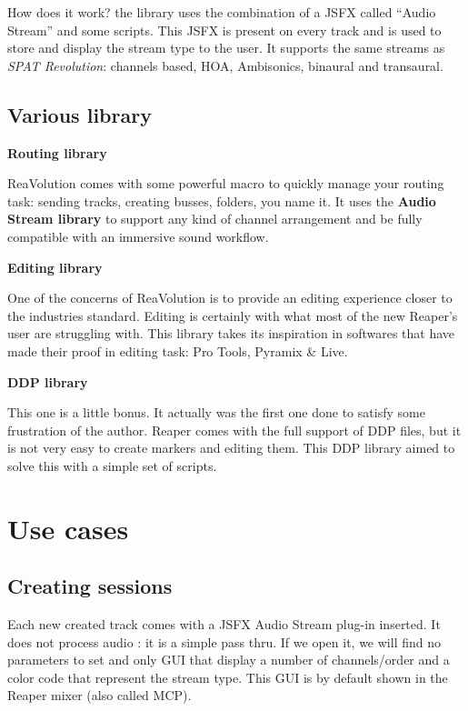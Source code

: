 \documentclass[
  letterpaper,
  DIV=11,
  numbers=noendperiod]{scrreport}
\begin{document}
How does it work? the library uses the combination of a JSFX called
``Audio Stream'' and some scripts. This JSFX is present on every track
and is used to store and display the stream type to the user. It
supports the same streams as \emph{SPAT Revolution}: channels based,
HOA, Ambisonics, binaural and transaural.

\hypertarget{various-library}{%
\subsection{Various library}\label{various-library}}

\textbf{Routing library}

ReaVolution comes with some powerful macro to quickly manage your
routing task: sending tracks, creating busses, folders, you name it. It
uses the \textbf{Audio Stream library} to support any kind of channel
arrangement and be fully compatible with an immersive sound workflow.

\textbf{Editing library}

One of the concerns of ReaVolution is to provide an editing experience
closer to the industries standard. Editing is certainly with what most
of the new Reaper's user are struggling with. This library takes its
inspiration in softwares that have made their proof in editing task: Pro
Tools, Pyramix \& Live.

\textbf{DDP library}

This one is a little bonus. It actually was the first one done to
satisfy some frustration of the author. Reaper comes with the full
support of DDP files, but it is not very easy to create markers and
editing them. This DDP library aimed to solve this with a simple set of
scripts.

\hypertarget{use-cases}{%
\section{Use cases}\label{use-cases}}

\hypertarget{creating-sessions}{%
\subsection{Creating sessions}\label{creating-sessions}}

Each new created track comes with a JSFX Audio Stream plug-in inserted.
It does not process audio : it is a simple pass thru. If we open it, we
will find no parameters to set and only GUI that display a number of
channels/order and a color code that represent the stream type. This GUI
is by default shown in the Reaper mixer (also called MCP).
\end{document}

